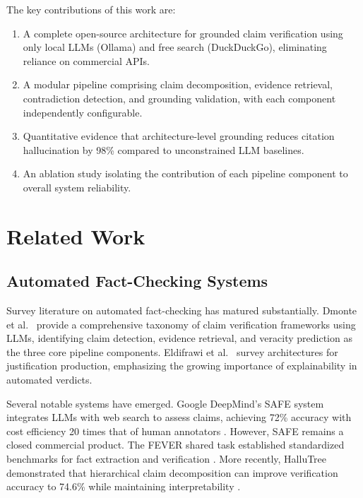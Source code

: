 \documentclass[conference]{IEEEtran}
\begin{document}
The key contributions of this work are:
\begin{enumerate}
    \item A complete open-source architecture for grounded claim verification using only local LLMs (Ollama) and free search (DuckDuckGo), eliminating reliance on commercial APIs.
    \item A modular pipeline comprising claim decomposition, evidence retrieval, contradiction detection, and grounding validation, with each component independently configurable.
    \item Quantitative evidence that architecture-level grounding reduces citation hallucination by 98\% compared to unconstrained LLM baselines.
    \item An ablation study isolating the contribution of each pipeline component to overall system reliability.
\end{enumerate}

\section{Related Work}

\subsection{Automated Fact-Checking Systems}

Survey literature on automated fact-checking has matured substantially. Dmonte et al.\ \cite{dmonte2025} provide a comprehensive taxonomy of claim verification frameworks using LLMs, identifying claim detection, evidence retrieval, and veracity prediction as the three core pipeline components. Eldifrawi et al.\ \cite{eldifrawi2024} survey architectures for justification production, emphasizing the growing importance of explainability in automated verdicts.

Several notable systems have emerged. Google DeepMind's SAFE system integrates LLMs with web search to assess claims, achieving 72\% accuracy with cost efficiency 20 times that of human annotators \cite{safe2024}. However, SAFE remains a closed commercial product. The FEVER shared task established standardized benchmarks for fact extraction and verification \cite{thorne2018fever}. More recently, HalluTree demonstrated that hierarchical claim decomposition can improve verification accuracy to 74.6\% while maintaining interpretability \cite{hallutree2025}.
\end{document}
